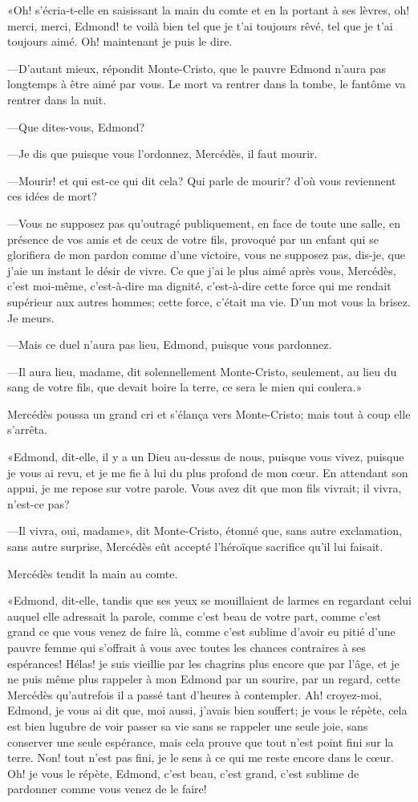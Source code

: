«Oh! s'écria-t-elle en saisissant la main du comte et en la portant à ses lèvres, oh! merci, merci, Edmond! te voilà bien tel que je t'ai toujours rêvé, tel que je t'ai toujours aimé. Oh! maintenant je puis le dire. 

—D'autant mieux, répondit Monte-Cristo, que le pauvre Edmond n'aura pas longtemps à être aimé par vous. Le mort va rentrer dans la tombe, le fantôme va rentrer dans la nuit. 

—Que dites-vous, Edmond? 

—Je dis que puisque vous l'ordonnez, Mercédès, il faut mourir. 

—Mourir! et qui est-ce qui dit cela? Qui parle de mourir? d'où vous reviennent ces idées de mort? 

—Vous ne supposez pas qu'outragé publiquement, en face de toute une salle, en présence de vos amis et de ceux de votre fils, provoqué par un enfant qui se glorifiera de mon pardon comme d'une victoire, vous ne supposez pas, dis-je, que j'aie un instant le désir de vivre. Ce que j'ai le plus aimé après vous, Mercédès, c'est moi-même, c'est-à-dire ma dignité, c'est-à-dire cette force qui me rendait supérieur aux autres hommes; cette force, c'était ma vie. D'un mot vous la brisez. Je meurs. 

—Mais ce duel n'aura pas lieu, Edmond, puisque vous pardonnez. 

—Il aura lieu, madame, dit solennellement Monte-Cristo, seulement, au lieu du sang de votre fils, que devait boire la terre, ce sera le mien qui coulera.» 

Mercédès poussa un grand cri et s'élança vers Monte-Cristo; mais tout à coup elle s'arrêta. 

«Edmond, dit-elle, il y a un Dieu au-dessus de nous, puisque vous vivez, puisque je vous ai revu, et je me fie à lui du plus profond de mon cœur. En attendant son appui, je me repose sur votre parole. Vous avez dit que mon fils vivrait; il vivra, n'est-ce pas? 

—Il vivra, oui, madame», dit Monte-Cristo, étonné que, sans autre exclamation, sans autre surprise, Mercédès eût accepté l'héroïque sacrifice qu'il lui faisait. 

Mercédès tendit la main au comte. 

«Edmond, dit-elle, tandis que ses yeux se mouillaient de larmes en regardant celui auquel elle adressait la parole, comme c'est beau de votre part, comme c'est grand ce que vous venez de faire là, comme c'est sublime d'avoir eu pitié d'une pauvre femme qui s'offrait à vous avec toutes les chances contraires à ses espérances! Hélas! je suis vieillie par les chagrins plus encore que par l'âge, et je ne puis même plus rappeler à mon Edmond par un sourire, par un regard, cette Mercédès qu'autrefois il a passé tant d'heures à contempler. Ah! croyez-moi, Edmond, je vous ai dit que, moi aussi, j'avais bien souffert; je vous le répète, cela est bien lugubre de voir passer sa vie sans se rappeler une seule joie, sans conserver une seule espérance, mais cela prouve que tout n'est point fini sur la terre. Non! tout n'est pas fini, je le sens à ce qui me reste encore dans le cœur. Oh! je vous le répète, Edmond, c'est beau, c'est grand, c'est sublime de pardonner comme vous venez de le faire! 

